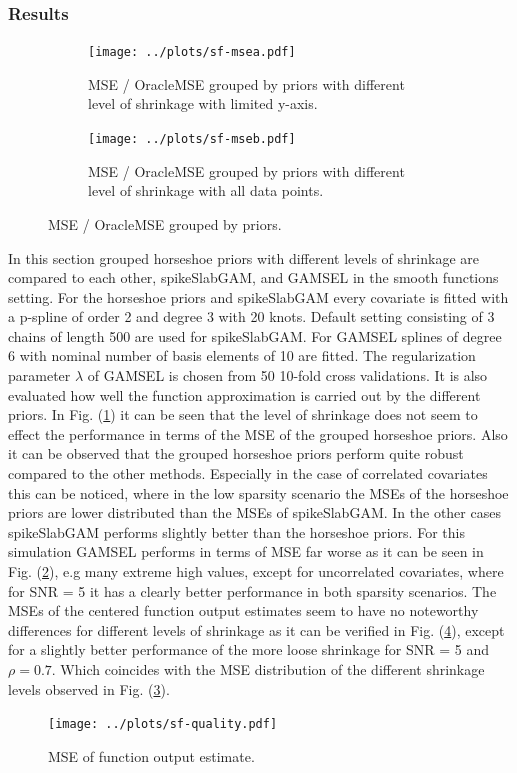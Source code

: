 \documentclass[12pt,letterpaper]{article}
\numberwithin{equation}{subsection}
\begin{document}
\subsubsection{Results}
\label{sec:sfres}
\begin{figure}[hbt!]
 \centering
\begin{subfigure}[b]{0.49\textwidth}
 \texttt{[image: ../plots/sf-msea.pdf]}
\caption {MSE / OracleMSE grouped by priors with different level of shrinkage with limited y-axis.}
 \label{fig:sf-msea}
\end{subfigure}\hfill
\begin{subfigure}[b]{0.49\textwidth}
 \texttt{[image: ../plots/sf-mseb.pdf]}
\caption {MSE / OracleMSE grouped by priors with different level of shrinkage with all data points.}
 \label{fig:sf-mseb}
 \end{subfigure}
 \caption[MSE / OracleMSE (smooth functions scenario)]{MSE / OracleMSE grouped by priors.}
  \label{fig:sf-mse}
\end{figure} 
In this section grouped horseshoe priors with different levels of shrinkage  are compared to each other, spikeSlabGAM, and GAMSEL in the smooth functions setting. For the horseshoe priors and spikeSlabGAM every covariate is fitted with a p-spline of order 2 and degree 3 with 20 knots. Default setting consisting of 3 chains of length 500 are used for spikeSlabGAM. For GAMSEL splines of degree 6 with nominal number of basis elements of 10 are fitted. The regularization parameter $\lambda$ of GAMSEL is chosen from 50 10-fold cross validations. It is also evaluated how well the function approximation is carried out by the different priors. 
In Fig. (\ref{fig:sf-msea}) it can be seen that the level of shrinkage does not seem to effect the performance in terms of the MSE of the grouped horseshoe priors.
Also it can be observed that the grouped horseshoe priors perform quite robust compared to the other methods. Especially in the case of correlated covariates this can be noticed, where in the low sparsity scenario the MSEs of the horseshoe priors are lower distributed than the MSEs of spikeSlabGAM. In the other cases spikeSlabGAM performs slightly better than the horseshoe priors. For this simulation GAMSEL performs in terms of MSE far worse as it can be seen in Fig. (\ref{fig:sf-mseb}), e.g many extreme high values, except for uncorrelated covariates, where for SNR = 5 it has a clearly better performance in both sparsity scenarios. 
The MSEs of the centered function output estimates seem to have no noteworthy differences for different levels of shrinkage as it can be verified in Fig. (\ref{fig:sf-quality}), except for a slightly better performance of the more loose shrinkage for SNR = 5 and $\rho = 0.7$. Which coincides with the MSE distribution of the different shrinkage levels observed in Fig. (\ref{fig:sf-mse}).
\begin{figure}[hbt!]
 \centering
 \texttt{[image: ../plots/sf-quality.pdf]}
 \caption{MSE of function output estimate.}
 \label{fig:sf-quality}
\end{figure}
\FloatBarrier
\pagebreak
\end{document}
